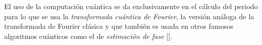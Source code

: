 El uso de la computación cuántica se da exclusivamente en el cálculo del periodo para lo que se usa la \textit{transformada cuántica de Fourier}, la versión análoga de la transformada de Fourier clásica y que también es usada en otros famosos algoritmos cuánticos como el de \textit{estimación de fase} [\cite[221-225]{nielsen2001quantum}].